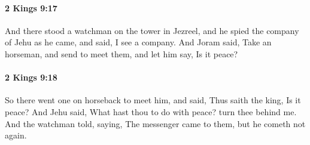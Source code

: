		\paragraph{2 Kings 9:17} %
			\label{2KINGS-9-17}

			And there stood a watchman on the tower in Jezreel, and he spied the company of Jehu as he came, and said, I see a company. And Joram said, Take an horseman, and send to meet them, and let him say, Is it peace?


		\paragraph{2 Kings 9:18} %
			\label{2KINGS-9-18}

			So there went one on horseback to meet him, and said, Thus saith the king, Is it peace? And Jehu said, What hast thou to do with peace? turn thee behind me. And the watchman told, saying, The messenger came to them, but he cometh not again.

